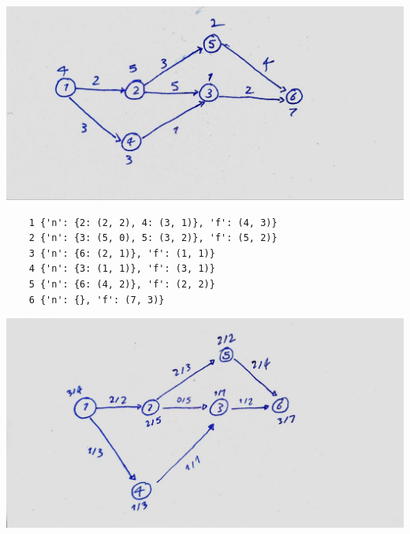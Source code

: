 \documentclass[]{article}
\begin{document}
\includegraphics*[scale=0.35]{initial.jpg}
\begin{latin}
\begin{lstlisting}
    1 {'n': {2: (2, 2), 4: (3, 1)}, 'f': (4, 3)}
    2 {'n': {3: (5, 0), 5: (3, 2)}, 'f': (5, 2)}
    3 {'n': {6: (2, 1)}, 'f': (1, 1)}
    4 {'n': {3: (1, 1)}, 'f': (3, 1)}
    5 {'n': {6: (4, 2)}, 'f': (2, 2)}
    6 {'n': {}, 'f': (7, 3)}       
\end{lstlisting}
\includegraphics*[scale=0.35]{answer.jpg}
\end{latin}
\end{document}
